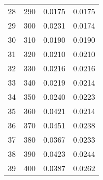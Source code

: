 \begin{table}
\begin{adjustbox}{width=1\textwidth/2}
\begin{tabular}{|c|c|c|c|}
\cline{1-4}
28 & 290 & 0.0175 & 0.0175 \\
\cline{1-4}
29 & 300 & 0.0231 & 0.0174 \\
\cline{1-4}
30 & 310 & 0.0190 & 0.0190 \\
\cline{1-4}
31 & 320 & 0.0210 & 0.0210 \\
\cline{1-4}
32 & 330 & 0.0216 & 0.0216 \\
\cline{1-4}
33 & 340 & 0.0219 & 0.0214 \\
\cline{1-4}
34 & 350 & 0.0240 & 0.0223 \\
\cline{1-4}
35 & 360 & 0.0421 & 0.0214 \\
\cline{1-4}
36 & 370 & 0.0451 & 0.0238 \\
\cline{1-4}
37 & 380 & 0.0367 & 0.0233 \\
\cline{1-4}
38 & 390 & 0.0423 & 0.0244 \\
\cline{1-4}
39 & 400 & 0.0387 & 0.0262 \\
\cline{1-4}
\end{tabular}
\end{adjustbox}
\end{table}

